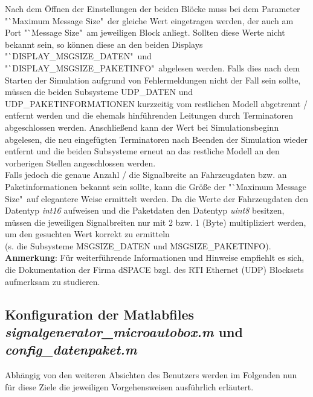 \documentclass[fontsize = 12pt, paper = a4]{scrreprt}
\begin{document}
Nach dem Öffnen der Einstellungen der beiden Blöcke muss bei dem Parameter "`Maximum Message Size"\ der gleiche Wert eingetragen werden, der auch am Port "`Message Size"\ am jeweiligen Block anliegt. Sollten diese Werte nicht bekannt sein, so können diese an den beiden Displays "`DISPLAY\_MSGSIZE\_DATEN"\ und "`DISPLAY\_MSGSIZE\_PAKETINFO"\ abgelesen werden. Falls dies nach dem Starten der Simulation aufgrund von Fehlermeldungen nicht der Fall sein sollte, müssen die beiden Subsysteme UDP\_DATEN und UDP\_PAKETINFORMATIONEN kurzzeitig vom restlichen Modell abgetrennt / entfernt werden und die ehemals hinführenden Leitungen durch Terminatoren abgeschlossen werden. Anschließend kann der Wert bei Simulationsbeginn abgelesen, die neu eingefügten Terminatoren nach Beenden der Simulation wieder entfernt und die beiden Subsysteme erneut an das restliche Modell an den vorherigen Stellen angeschlossen werden. \\ 

Falls jedoch die genaue Anzahl / die Signalbreite an Fahrzeugdaten bzw. an Paketinformationen bekannt sein sollte, kann die Größe der "`Maximum Message Size"\ auf elegantere Weise ermittelt werden. Da die Werte der Fahrzeugdaten den Datentyp \textit{int16} aufweisen und die Paketdaten den Datentyp \textit{uint8} besitzen, müssen die jeweiligen Signalbreiten nur mit 2 bzw. 1 (Byte) multipliziert werden, um den gesuchten Wert korrekt zu ermitteln \\ (s. die Subsysteme MSGSIZE\_DATEN und MSGSIZE\_PAKETINFO). \\  

\textbf{Anmerkung}: Für weiterführende Informationen und Hinweise empfiehlt es sich, die Dokumentation der Firma dSPACE bzgl. des RTI Ethernet (UDP) Blocksets aufmerksam zu studieren. 

\newpage





\subsection{Konfiguration der Matlabfiles \textit{signalgenerator\_microautobox.m} und \textit{config\_datenpaket.m}}


Abhängig von den weiteren Absichten des Benutzers werden im Folgenden nun für diese Ziele die jeweiligen Vorgehensweisen ausführlich erläutert. 
\end{document}
